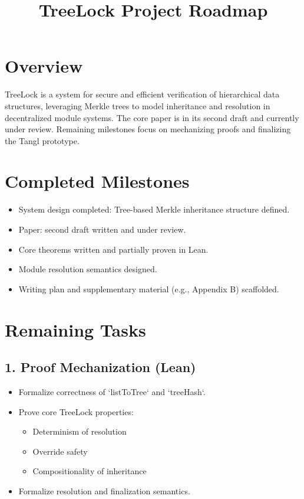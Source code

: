 \documentclass{article}
\title{TreeLock Project Roadmap}
\author{}
\date{}
\begin{document}
\maketitle

\section*{Overview}
TreeLock is a system for secure and efficient verification of hierarchical data structures, leveraging Merkle trees to model inheritance and resolution in decentralized module systems. The core paper is in its second draft and currently under review. Remaining milestones focus on mechanizing proofs and finalizing the Tangl prototype.

\section*{Completed Milestones}
\begin{itemize}[label=--]
  \item System design completed: Tree-based Merkle inheritance structure defined.
  \item Paper: second draft written and under review.
  \item Core theorems written and partially proven in Lean.
  \item Module resolution semantics designed.
  \item Writing plan and supplementary material (e.g., Appendix B) scaffolded.
\end{itemize}

\section*{Remaining Tasks}

\subsection*{1. Proof Mechanization (Lean)}
\begin{itemize}[label=--]
  \item Formalize correctness of `listToTree` and `treeHash`.
  \item Prove core TreeLock properties:
    \begin{itemize}
      \item Determinism of resolution
      \item Override safety
      \item Compositionality of inheritance
    \end{itemize}
  \item Formalize resolution and finalization semantics.
\end{itemize}
\end{document}
